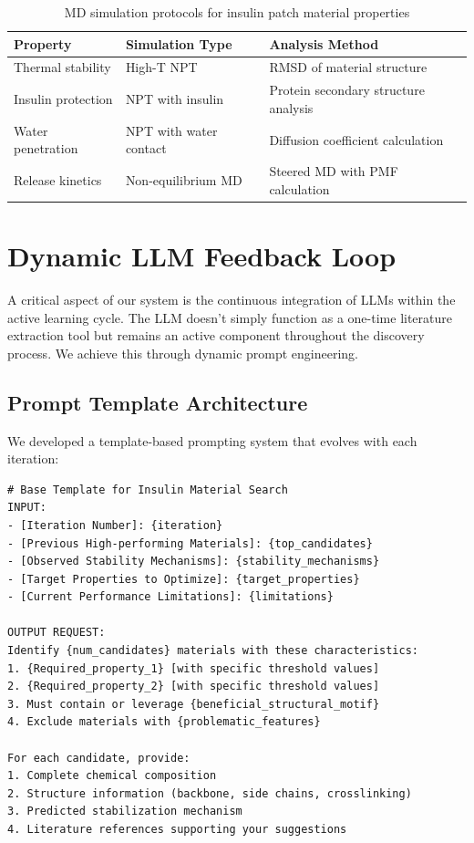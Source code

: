 \documentclass[11pt,a4paper]{article}
\begin{document}
\begin{table}[h]
\centering
\begin{tabularx}{\linewidth}{XlX}
\toprule
\textbf{Property} & \textbf{Simulation Type} & \textbf{Analysis Method} \\
\midrule
Thermal stability & High-T NPT & RMSD of material structure \\
Insulin protection & NPT with insulin & Protein secondary structure analysis \\
Water penetration & NPT with water contact & Diffusion coefficient calculation \\
Release kinetics & Non-equilibrium MD & Steered MD with PMF calculation \\
\bottomrule
\end{tabularx}
\caption{MD simulation protocols for insulin patch material properties}
\label{tab:md_protocols}
\end{table}

\section{Dynamic LLM Feedback Loop}

A critical aspect of our system is the continuous integration of LLMs within the active learning cycle. The LLM doesn't simply function as a one-time literature extraction tool but remains an active component throughout the discovery process. We achieve this through dynamic prompt engineering.

\subsection{Prompt Template Architecture}

We developed a template-based prompting system that evolves with each iteration:

\begin{lstlisting}
# Base Template for Insulin Material Search
INPUT:
- [Iteration Number]: {iteration}
- [Previous High-performing Materials]: {top_candidates}
- [Observed Stability Mechanisms]: {stability_mechanisms}
- [Target Properties to Optimize]: {target_properties}
- [Current Performance Limitations]: {limitations}

OUTPUT REQUEST:
Identify {num_candidates} materials with these characteristics:
1. {Required_property_1} [with specific threshold values]
2. {Required_property_2} [with specific threshold values]
3. Must contain or leverage {beneficial_structural_motif}
4. Exclude materials with {problematic_features}

For each candidate, provide:
1. Complete chemical composition
2. Structure information (backbone, side chains, crosslinking)
3. Predicted stabilization mechanism
4. Literature references supporting your suggestions
\end{lstlisting}
\end{document}
